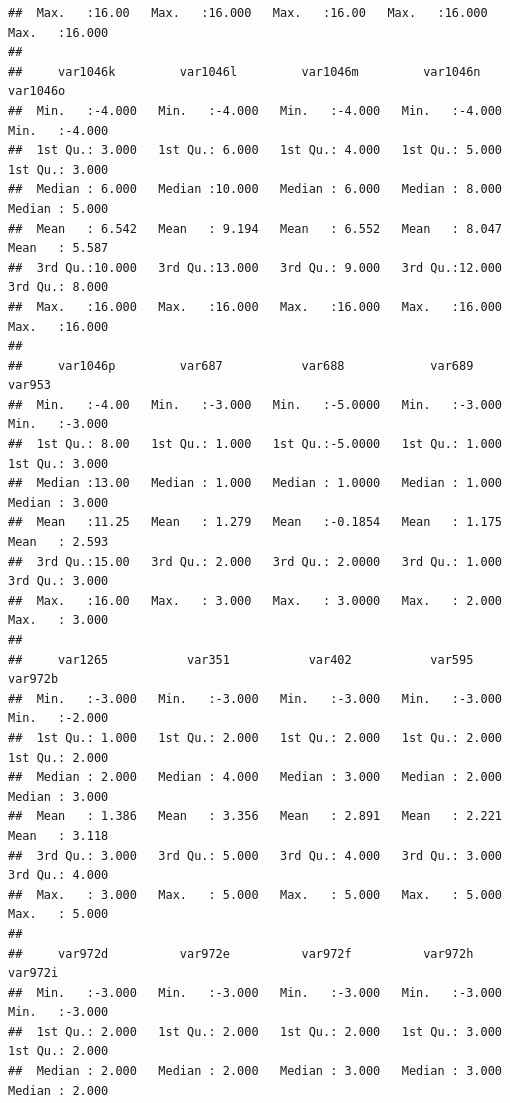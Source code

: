 \documentclass[
]{book}
\begin{document}
\begin{verbatim}
##  Max.   :16.00   Max.   :16.000   Max.   :16.00   Max.   :16.000   Max.   :16.000  
##                                                                                    
##     var1046k         var1046l         var1046m         var1046n         var1046o     
##  Min.   :-4.000   Min.   :-4.000   Min.   :-4.000   Min.   :-4.000   Min.   :-4.000  
##  1st Qu.: 3.000   1st Qu.: 6.000   1st Qu.: 4.000   1st Qu.: 5.000   1st Qu.: 3.000  
##  Median : 6.000   Median :10.000   Median : 6.000   Median : 8.000   Median : 5.000  
##  Mean   : 6.542   Mean   : 9.194   Mean   : 6.552   Mean   : 8.047   Mean   : 5.587  
##  3rd Qu.:10.000   3rd Qu.:13.000   3rd Qu.: 9.000   3rd Qu.:12.000   3rd Qu.: 8.000  
##  Max.   :16.000   Max.   :16.000   Max.   :16.000   Max.   :16.000   Max.   :16.000  
##                                                                                      
##     var1046p         var687           var688            var689           var953      
##  Min.   :-4.00   Min.   :-3.000   Min.   :-5.0000   Min.   :-3.000   Min.   :-3.000  
##  1st Qu.: 8.00   1st Qu.: 1.000   1st Qu.:-5.0000   1st Qu.: 1.000   1st Qu.: 3.000  
##  Median :13.00   Median : 1.000   Median : 1.0000   Median : 1.000   Median : 3.000  
##  Mean   :11.25   Mean   : 1.279   Mean   :-0.1854   Mean   : 1.175   Mean   : 2.593  
##  3rd Qu.:15.00   3rd Qu.: 2.000   3rd Qu.: 2.0000   3rd Qu.: 1.000   3rd Qu.: 3.000  
##  Max.   :16.00   Max.   : 3.000   Max.   : 3.0000   Max.   : 2.000   Max.   : 3.000  
##                                                                                      
##     var1265           var351           var402           var595          var972b      
##  Min.   :-3.000   Min.   :-3.000   Min.   :-3.000   Min.   :-3.000   Min.   :-2.000  
##  1st Qu.: 1.000   1st Qu.: 2.000   1st Qu.: 2.000   1st Qu.: 2.000   1st Qu.: 2.000  
##  Median : 2.000   Median : 4.000   Median : 3.000   Median : 2.000   Median : 3.000  
##  Mean   : 1.386   Mean   : 3.356   Mean   : 2.891   Mean   : 2.221   Mean   : 3.118  
##  3rd Qu.: 3.000   3rd Qu.: 5.000   3rd Qu.: 4.000   3rd Qu.: 3.000   3rd Qu.: 4.000  
##  Max.   : 3.000   Max.   : 5.000   Max.   : 5.000   Max.   : 5.000   Max.   : 5.000  
##                                                                                      
##     var972d          var972e          var972f          var972h          var972i      
##  Min.   :-3.000   Min.   :-3.000   Min.   :-3.000   Min.   :-3.000   Min.   :-3.000  
##  1st Qu.: 2.000   1st Qu.: 2.000   1st Qu.: 2.000   1st Qu.: 3.000   1st Qu.: 2.000  
##  Median : 2.000   Median : 2.000   Median : 3.000   Median : 3.000   Median : 2.000  

\end{verbatim}
\end{document}
